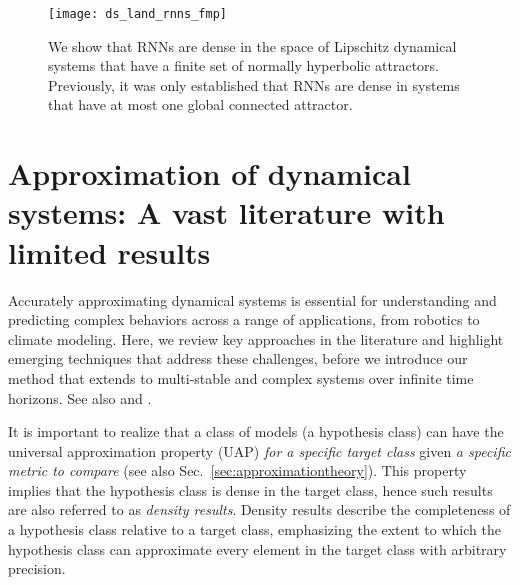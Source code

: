 \documentclass{article}
\theoremstyle{definition} \newtheorem{definition}{Definition}
\theoremstyle{remark} \newtheorem{remark}{Remark}
\newcounter{ct}
\begin{document}
\setlength\belowcaptionskip{-5ex}
\begin{figure}
  \centering
  \texttt{[image: ds\_land\_rnns\_fmp]}
  \caption{We show that RNNs are dense in the space of Lipschitz dynamical systems that have a finite set of normally hyperbolic attractors.
  Previously, it was only established that RNNs are dense in systems that have at most one global connected attractor.
  }\label{fig:ds_land_rnns_fmp}
\end{figure}




\section{Approximation of dynamical systems: A vast literature with limited results}
Accurately approximating dynamical systems is essential for understanding and predicting complex behaviors across a range of applications, from robotics to climate modeling.
Here, we review key approaches in the literature and highlight emerging techniques that address these challenges, before we introduce our method that extends to multi-stable and complex systems over infinite time horizons.
See also \citep{li2022approximation} and \citep{jiang2023brief}.

It is important to realize that a class of models (a hypothesis class) can have the universal approximation property (UAP) \emph{for a specific target class} given \emph{a specific metric to compare} (see also Sec.~\ref{sec:approximationtheory}).
This property implies that the hypothesis class is dense in the target class, hence such results are also referred to as \emph{density results}.
Density results describe the completeness of a hypothesis class relative to a target class, emphasizing the extent to which the hypothesis class can approximate every element in the target class with arbitrary precision.


 
\end{document}
